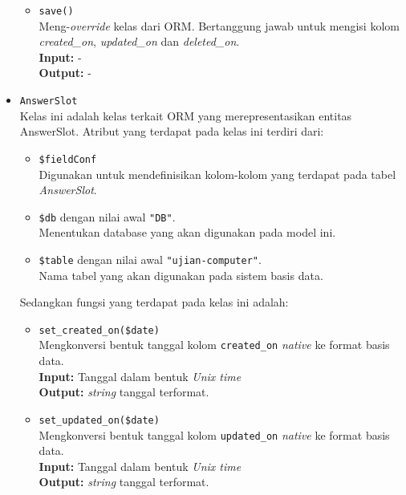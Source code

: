\begin{itemize}
\begin{itemize}
                \item \texttt{save()}\\
                    Meng-\textit{override} kelas dari ORM. Bertanggung jawab untuk mengisi
                    kolom \textit{created\_on}, \textit{updated\_on} dan \textit{deleted\_on}.\\
                    \textbf{Input:} -\\
                    \textbf{Output:} -
            \end{itemize}
            
        \item \texttt{AnswerSlot} \\
            Kelas ini adalah kelas terkait ORM yang merepresentasikan entitas AnswerSlot. Atribut yang 
            terdapat pada kelas ini terdiri dari:
            \begin{itemize}
                \item \texttt{\$fieldConf} \\
                    Digunakan untuk mendefinisikan kolom-kolom yang terdapat pada tabel \textit{AnswerSlot}.
                \item \texttt{\$db} dengan nilai awal \texttt{"DB"}. \\
                    Menentukan database yang akan digunakan pada model ini.
                \item \texttt{\$table} dengan nilai awal \texttt{"ujian-computer"}. \\
                    Nama tabel yang akan digunakan pada sistem basis data. 
            \end{itemize}
            Sedangkan fungsi yang terdapat pada kelas ini adalah:
            \begin{itemize}
                \item \texttt{set\_created\_on(\$date)} \\
                    Mengkonversi bentuk tanggal kolom \texttt{created\_on} \textit{native} ke 
                    format basis data. \\
                    \textbf{Input:} Tanggal dalam bentuk \textit{Unix time}\\
                    \textbf{Output:} \textit{string} tanggal terformat.
                
                \item \texttt{set\_updated\_on(\$date)} \\
                    Mengkonversi bentuk tanggal kolom \texttt{updated\_on} \textit{native} ke 
                    format basis data. \\
                    \textbf{Input:} Tanggal dalam bentuk \textit{Unix time}\\
                    \textbf{Output:} \textit{string} tanggal terformat.
                    

\end{itemize}
\end{itemize}

